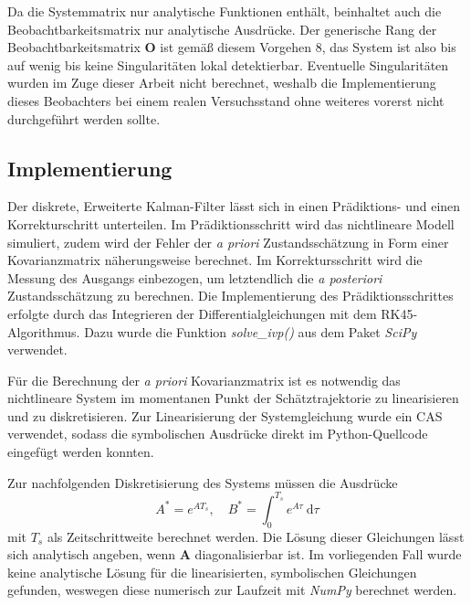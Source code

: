 \documentclass[10pt,twocolumn]{article}
\begin{document}
	Da die Systemmatrix nur analytische Funktionen enthält, beinhaltet auch die Beobachtbarkeitsmatrix nur analytische Ausdrücke. 
	Der generische Rang der Beobachtbarkeitsmatrix $\bm O$ ist gemäß diesem Vorgehen 8, das System ist also bis auf wenig bis keine Singularitäten lokal detektierbar.
	Eventuelle Singularitäten wurden im Zuge dieser Arbeit nicht berechnet, weshalb die Implementierung dieses Beobachters bei einem realen Versuchsstand ohne weiteres vorerst nicht durchgeführt werden sollte.
	
	\subsection{Implementierung}
	Der diskrete, Erweiterte Kalman-Filter lässt sich in einen Prädiktions- und einen Korrekturschritt unterteilen. 
	Im Prädiktionsschritt wird das nichtlineare Modell simuliert, zudem wird der Fehler der \textit{a priori} Zustandsschätzung in Form einer Kovarianzmatrix näherungsweise berechnet.
	Im Korrektursschritt wird die Messung des Ausgangs einbezogen, um letztendlich die \textit{a posteriori} Zustandsschätzung zu berechnen.
	Die Implementierung des Prädiktionsschrittes erfolgte durch das Integrieren der Differentialgleichungen mit dem RK45-Algorithmus.
	Dazu wurde die Funktion \textit{solve\_ivp()} aus dem Paket \textit{SciPy} verwendet.
	
	Für die Berechnung der \textit{a priori} Kovarianzmatrix ist es notwendig das nichtlineare System im momentanen Punkt der Schätztrajektorie zu linearisieren und zu diskretisieren.
	Zur Linearisierung der Systemgleichung wurde ein CAS verwendet, sodass die symbolischen Ausdrücke direkt im Python-Quellcode eingefügt werden konnten.
	
	Zur nachfolgenden Diskretisierung des Systems müssen die Ausdrücke
	$$A^* = e^{A T_s},\quad B^* = \int_{0}^{T_s} e^{A \tau} \: \mathrm{d}\tau$$
	mit $T_s$ als Zeitschrittweite berechnet werden. 
	Die Lösung dieser Gleichungen lässt sich analytisch angeben, wenn $\bm A$	diagonalisierbar ist.
	Im vorliegenden Fall wurde keine analytische Lösung für die linearisierten, symbolischen Gleichungen gefunden, weswegen diese numerisch zur Laufzeit mit \textit{NumPy} berechnet werden.

	
\end{document}
